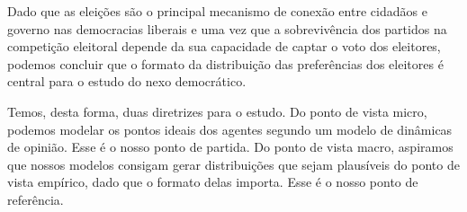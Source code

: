 Dado que as eleições são o principal mecanismo de conexão entre cidadãos e
governo nas democracias liberais \cite{dahl1989democracy} e uma vez que a
sobrevivência dos partidos na competição eleitoral depende da sua capacidade de
captar o voto dos eleitores, podemos concluir que o formato da distribuição das
preferências dos eleitores é central para o estudo do nexo democrático.

Temos, desta forma, duas diretrizes para o estudo. Do ponto de vista micro,
podemos modelar os pontos ideais dos agentes segundo um modelo de dinâmicas de
opinião. Esse é o nosso ponto de partida. Do ponto de vista macro, aspiramos que
nossos modelos consigam gerar distribuições que sejam plausíveis do ponto de
vista empírico, dado que o formato delas importa. Esse é o nosso ponto de
referência.





